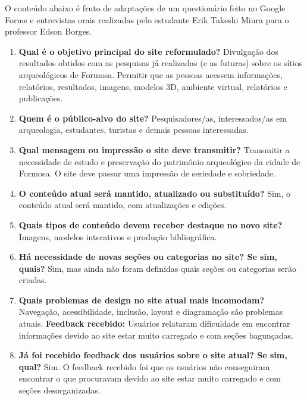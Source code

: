 
O conteúdo abaixo é fruto de adaptações de um questionário feito no Google Forms e entrevistas orais realizadas pelo estudante Erik Takeshi Miura para o professor Edson Borges.


\begin{enumerate}
    \item \textbf{Qual é o objetivo principal do site reformulado?}  
    Divulgação dos resultados obtidos com as pesquisas já realizadas (e as futuras) sobre os sítios arqueológicos de Formosa.  
    Permitir que as pessoas acessem informações, relatórios, resultados, imagens, modelos 3D, ambiente virtual, relatórios e publicações.

    \item \textbf{Quem é o público-alvo do site?}  
    Pesquisadores/as, interessados/as em arqueologia, estudantes, turistas e demais pessoas interessadas.

    \item \textbf{Qual mensagem ou impressão o site deve transmitir?}  
    Transmitir a necessidade de estudo e preservação do patrimônio arqueológico da cidade de Formosa.  
    O site deve passar uma impressão de seriedade e sobriedade.

    \item \textbf{O conteúdo atual será mantido, atualizado ou substituído?}  
    Sim, o conteúdo atual será mantido, com atualizações e edições.

    \item \textbf{Quais tipos de conteúdo devem receber destaque no novo site?}  
    Imagens, modelos interativos e produção bibliográfica.

    \item \textbf{Há necessidade de novas seções ou categorias no site? Se sim, quais?}  
    Sim, mas ainda não foram definidas quais seções ou categorias serão criadas.

    \item \textbf{Quais problemas de design no site atual mais incomodam?}  
    Navegação, acessibilidade, inclusão, layout e diagramação são problemas atuais.  
    \textbf{Feedback recebido:} Usuários relataram dificuldade em encontrar informações devido ao site estar muito carregado e com seções bagunçadas.

    \item \textbf{Já foi recebido feedback dos usuários sobre o site atual? Se sim, qual?}  
    Sim. O feedback recebido foi que os usuários não conseguiram encontrar o que procuravam devido ao site estar muito carregado e com seções desorganizadas.


\end{enumerate}
